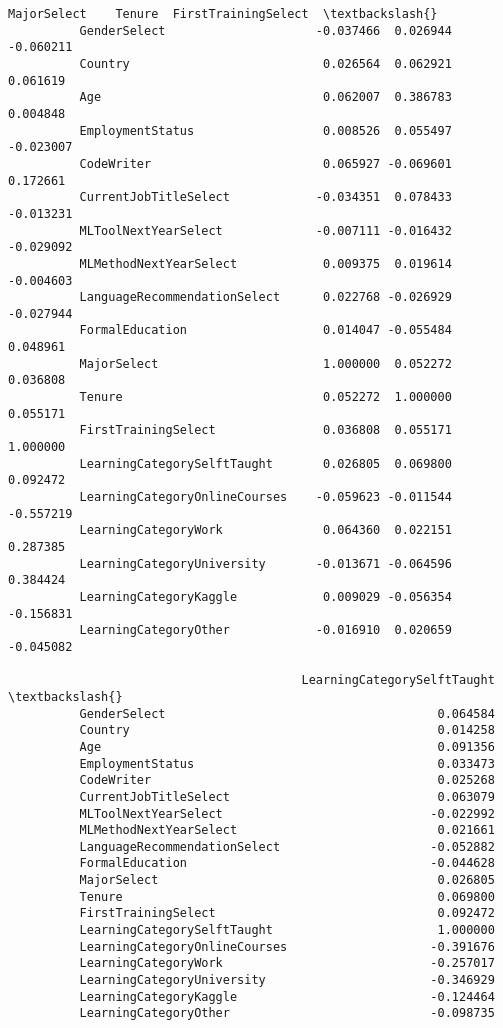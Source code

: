 \documentclass[11pt]{article}
\begin{document}
\begin{Verbatim}[commandchars=\\\{\}]
                                         MajorSelect    Tenure  FirstTrainingSelect  \textbackslash{}
          GenderSelect                     -0.037466  0.026944            -0.060211   
          Country                           0.026564  0.062921             0.061619   
          Age                               0.062007  0.386783             0.004848   
          EmploymentStatus                  0.008526  0.055497            -0.023007   
          CodeWriter                        0.065927 -0.069601             0.172661   
          CurrentJobTitleSelect            -0.034351  0.078433            -0.013231   
          MLToolNextYearSelect             -0.007111 -0.016432            -0.029092   
          MLMethodNextYearSelect            0.009375  0.019614            -0.004603   
          LanguageRecommendationSelect      0.022768 -0.026929            -0.027944   
          FormalEducation                   0.014047 -0.055484             0.048961   
          MajorSelect                       1.000000  0.052272             0.036808   
          Tenure                            0.052272  1.000000             0.055171   
          FirstTrainingSelect               0.036808  0.055171             1.000000   
          LearningCategorySelftTaught       0.026805  0.069800             0.092472   
          LearningCategoryOnlineCourses    -0.059623 -0.011544            -0.557219   
          LearningCategoryWork              0.064360  0.022151             0.287385   
          LearningCategoryUniversity       -0.013671 -0.064596             0.384424   
          LearningCategoryKaggle            0.009029 -0.056354            -0.156831   
          LearningCategoryOther            -0.016910  0.020659            -0.045082   
          
                                         LearningCategorySelftTaught  \textbackslash{}
          GenderSelect                                      0.064584   
          Country                                           0.014258   
          Age                                               0.091356   
          EmploymentStatus                                  0.033473   
          CodeWriter                                        0.025268   
          CurrentJobTitleSelect                             0.063079   
          MLToolNextYearSelect                             -0.022992   
          MLMethodNextYearSelect                            0.021661   
          LanguageRecommendationSelect                     -0.052882   
          FormalEducation                                  -0.044628   
          MajorSelect                                       0.026805   
          Tenure                                            0.069800   
          FirstTrainingSelect                               0.092472   
          LearningCategorySelftTaught                       1.000000   
          LearningCategoryOnlineCourses                    -0.391676   
          LearningCategoryWork                             -0.257017   
          LearningCategoryUniversity                       -0.346929   
          LearningCategoryKaggle                           -0.124464   
          LearningCategoryOther                            -0.098735   
          

\end{Verbatim}
\end{document}
